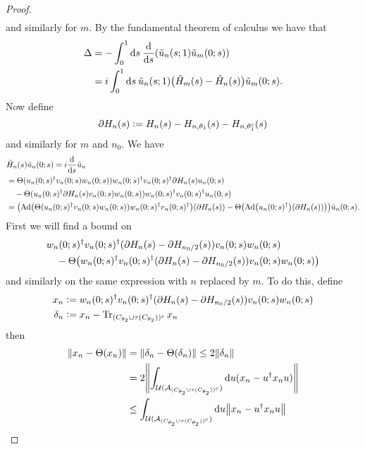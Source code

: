 \documentclass[12pt,a4paper,twoside]{article}
\renewcommand{\d}{\text{d}}
\newcommand{\defeq}{\vcentcolon=}
\let\originalleft\left
\let\originalright\right
\renewcommand{\left}{\mathopen{}\mathclose\bgroup\originalleft}
\renewcommand{\right}{\aftergroup\egroup\originalright}
\newcommand{\UU}{\mathcal U}
\renewcommand{\AA}{\mathcal A}
\newcommand{\Ad}[1]{\textrm{Ad}\left(#1\right)}
\theoremstyle{definition}
\numberwithin{equation}{section}
\begin{document}
\begin{proof}
\begin{align}
	\end{align}
	and similarly for $m$. By the fundamental theorem of calculus we have that
	\begin{align}
		\Delta&=-\int_0^1\d s\:\frac{\d}{\d s}\left(\tilde{u}_n(s;1)\tilde{u}_m(0;s)\right)\\
		&=i\int_0^1\d s \: \tilde{u}_n(s;1)\left(\tilde{H}_m(s)-\tilde{H}_n(s)\right)\tilde{u}_m(0;s).
	\end{align}
	Now define
	\begin{equation}
		\partial H_n(s)\defeq H_n(s)-H_{n,\theta_1}(s)-H_{n,\theta_1^c}(s)
	\end{equation}
	and similarly for $m$ and $n_0$. We have
	\begin{align}
		&\tilde{H}_n(s)\tilde{u}_n(0;s)=i\frac{\d}{\d s}\tilde{u}_n\\
		&=\Theta(u_n(0;s)^\dagger v_n(0;s)w_n(0;s))w_n(0;s)^\dagger v_n(0;s)^\dagger \partial H_n(s) u_n(0;s)\\
		\nonumber
		&\quad-\Theta(u_n(0;s)^\dagger \partial H_n(s) v_n(0;s)w_n(0;s))w_n(0;s)^\dagger v_n(0;s)^\dagger u_n(0;s)\\
		&=\left(\Ad{\Theta(u_n(0;s)^\dagger v_n(0;s)w_n(0;s))w_n(0;s)^\dagger v_n(0;s)^\dagger}(\partial H_n(s))-\Theta\left(\Ad{u_n(0;s)^\dagger}(\partial H_n(s))\right)\right)\tilde{u}_n(0;s).
	\end{align}
	First we will find a bound on
	\begin{align}
		&w_n(0;s)^\dagger v_n(0;s)^\dagger(\partial H_n(s)-\partial H_{n_0/2}(s))v_n(0;s)w_n(0;s)\\
	\nonumber
		&\quad-\Theta\left(w_n(0;s)^\dagger v_n(0;s)^\dagger(\partial H_n(s)-\partial H_{n_0/2}(s))v_n(0;s)w_n(0;s)\right)
	\end{align}
	and similarly on the same expression with $n$ replaced by $m$. To do this, define
	\begin{align}
		x_n&\defeq w_n(0;s)^\dagger v_n(0;s)^\dagger(\partial H_n(s)-\partial H_{n_0/2}(s))v_n(0;s)w_n(0;s)\\
		\delta_n&\defeq x_n-\Tr_{(C_{\theta_2}\cup \tau(C_{\theta_2}))^c}x_n
	\end{align}
	then
	\begin{align}
		\norm{x_n-\Theta(x_n)}&=\norm{\delta_n-\Theta(\delta_n)}\leq 2\norm{\delta_n}\\
		&=2\norm{\int_{\UU(\AA_{(C_{\theta_2}\cup \tau(C_{\theta_2}))^c})}\d u (x_n-u^\dagger x_n u)}\\
		&\leq \int_{\UU(\AA_{(C_{\theta_2}\cup \tau(C_{\theta_2}))^c})}\d u \norm{x_n-u^\dagger x_n u}\\

\end{align}
\end{proof}
\end{document}
